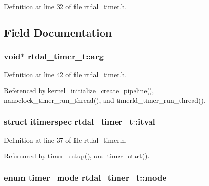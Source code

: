 Definition at line 32 of file rtdal\-\_\-timer.\-h.



\subsection{Field Documentation}
\hypertarget{structrtdal__timer__t_ac956640df81f13d496555dc5de7b1c80}{
\subsubsection[{arg}]{\setlength{\rightskip}{0pt plus 5cm}void$\ast$ rtdal\-\_\-timer\-\_\-t\-::arg}}\label{structrtdal__timer__t_ac956640df81f13d496555dc5de7b1c80}


Definition at line 42 of file rtdal\-\_\-timer.\-h.



Referenced by kernel\-\_\-initialize\-\_\-create\-\_\-pipeline(), nanoclock\-\_\-timer\-\_\-run\-\_\-thread(), and timerfd\-\_\-timer\-\_\-run\-\_\-thread().

\hypertarget{structrtdal__timer__t_ae5b29f6b10dd563261807b39bc1431c0}{
\subsubsection[{itval}]{\setlength{\rightskip}{0pt plus 5cm}struct itimerspec rtdal\-\_\-timer\-\_\-t\-::itval}}\label{structrtdal__timer__t_ae5b29f6b10dd563261807b39bc1431c0}


Definition at line 37 of file rtdal\-\_\-timer.\-h.



Referenced by timer\-\_\-setup(), and timer\-\_\-start().

\hypertarget{structrtdal__timer__t_a5c6e934cbc400f85f5022346a532d01b}{
\subsubsection[{mode}]{\setlength{\rightskip}{0pt plus 5cm}enum {\bf timer\-\_\-mode} rtdal\-\_\-timer\-\_\-t\-::mode}}\label{structrtdal__timer__t_a5c6e934cbc400f85f5022346a532d01b}


